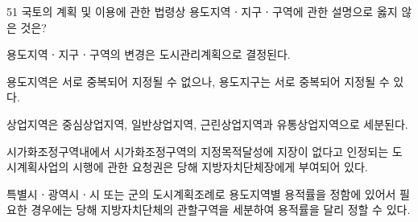 \begin{question}{51}
국토의 계획 및 이용에 관한 법령상 용도지역ㆍ지구ㆍ구역에 관한 설명으로 옳지 않은 것은?
\begin{choices}
  \item 용도지역ㆍ지구ㆍ구역의 변경은 도시관리계획으로 결정된다.
  \item 용도지역은 서로 중복되어 지정될 수 없으나, 용도지구는 서로 중복되어 지정될 수 있다.
  \item 상업지역은 중심상업지역, 일반상업지역, 근린상업지역과 유통상업지역으로 세분된다.
  \item 시가화조정구역내에서 시가화조정구역의 지정목적달성에 지장이 없다고 인정되는 도시계획사업의 시행에 관한 요청권은 당해 지방자치단체장에게 부여되어 있다.
  \item 특별시ㆍ광역시ㆍ시 또는 군의 도시계획조례로 용도지역별 용적률을 정함에 있어서 필요한 경우에는 당해 지방자치단체의 관할구역을 세분하여 용적률을 달리 정할 수 있다.
\end{choices}
\end{question}

